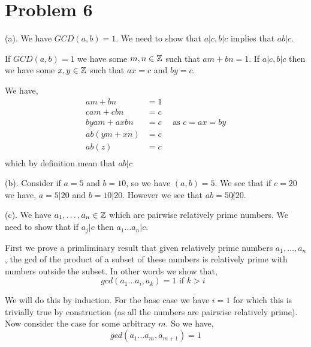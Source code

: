 \documentclass[a4paper]{report}
\begin{document}



\section*{Problem 6}

(a). We have $GCD(a, b) = 1$. We need to show that  $a | c, b | c $ implies that  $ab | c$.

If $ GCD(a, b)= 1$ we have  some $m,n \in \mathbb{Z}$ such that $am + bn = 1$. If  $a | c, b | c$ then we have  some  $x,y \in \mathbb{Z}$ such that  $ax = c$ and  $by = c$.

We have, 
\begin{align*}
    am + bn &= 1\\
    cam + cbn &= c\\
    byam + axbn &= c \quad \text{ as $c = ax = by$}\\
    ab(ym + xn) &= c \\
    ab(z) &= c \\
\end{align*}
which by definition mean that $ab | c$


(b). Consider if $a = 5$ and  $b = 10$, so we have  $(a, b) = 5$.  We see that if $c = 20$ we have, $a = 5 | 20$ and  $b = 10 | 20$. However we see that $ab = 50 \not | 20$.


(c). We have $a_1, \dots, a_n \in \mathbb{Z}$ which are pairwise relatively prime numbers. We need to show that if $a_j | c$ then  $a_1\dots a_n | c$.

First we prove a primliminary result that given relatively prime numbers $a_1,\dots,a_n$, the gcd of the product of a subset of these numbers is relatively prime with numbers outside the subset. In other words we show that, 
$$ gcd(a_1\dots a_i, a_k) = 1 \text{ if $k > i$ } $$ 


We will do this by induction. For the base case we have $i = 1$  for which this is trivially true by construction (as all the numbers are pairwise relatively prime). Now consider the case for some arbitrary $m$. So we have,  
$$ gcd(a_1 \dots a_m, a_{m + 1}) = 1 $$ 
\end{document}
